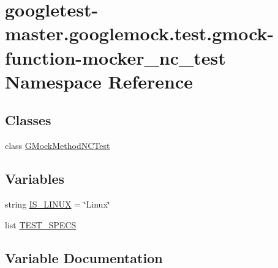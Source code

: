 \hypertarget{namespacegoogletest-master_1_1googlemock_1_1test_1_1gmock-function-mocker__nc__test}{}\section{googletest-\/master.googlemock.\+test.\+gmock-\/function-\/mocker\+\_\+nc\+\_\+test Namespace Reference}
\label{namespacegoogletest-master_1_1googlemock_1_1test_1_1gmock-function-mocker__nc__test}
\subsection*{Classes}
\begin{DoxyCompactItemize}
\item 
class \mbox{\hyperlink{classgoogletest-master_1_1googlemock_1_1test_1_1gmock-function-mocker__nc__test_1_1_g_mock_method_n_c_test}{G\+Mock\+Method\+N\+C\+Test}}
\end{DoxyCompactItemize}
\subsection*{Variables}
\begin{DoxyCompactItemize}
\item 
string \mbox{\hyperlink{namespacegoogletest-master_1_1googlemock_1_1test_1_1gmock-function-mocker__nc__test_a25b6cc2ab6d75ff02baa892d2d163780}{I\+S\+\_\+\+L\+I\+N\+UX}} = \char`\"{}Linux\char`\"{}
\item 
list \mbox{\hyperlink{namespacegoogletest-master_1_1googlemock_1_1test_1_1gmock-function-mocker__nc__test_a03c84b881686afe9cebf45842d0f6184}{T\+E\+S\+T\+\_\+\+S\+P\+E\+CS}}
\end{DoxyCompactItemize}


\subsection{Variable Documentation}
\mbox{\label{namespacegoogletest-master_1_1googlemock_1_1test_1_1gmock-function-mocker__nc__test_a25b6cc2ab6d75ff02baa892d2d163780}} 
